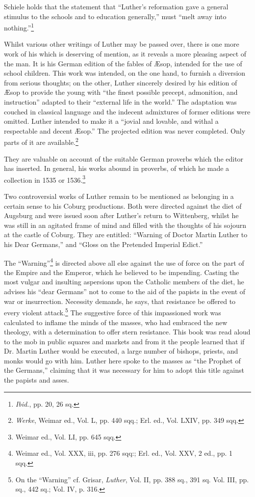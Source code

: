 Schiele holds that the statement that “Luther’s reformation gave a general
stimulus to the schools and to education generally,” must “melt away
into nothing.”\footnote{\textit{Ibid.}, pp. 20, 26 sq.}


Whilst various other writings of Luther may be passed over, there
is one more work of his which is deserving of mention, as it reveals
a more pleasing aspect of the man. It is his German edition of the
fables of Æsop, intended for the use of school children. This work
was intended, on the one hand, to furnish a diversion from serious
thoughts; on the other, Luther sincerely desired by his edition of
Æsop to provide the young with “the finest possible precept, admonition,
and instruction” adapted to their “external life in the world.”
The adaptation was couched in classical language and the indecent
admixtures of former editions were omitted. Luther intended to make
it a “jovial and lovable, and withal a respectable and decent Æsop.”
The projected edition was never completed. Only parts of it are
available.\footnote{\textit{Werke}, Weimar ed., Vol. L, pp. 440 sqq.; Erl. ed., Vol. LXIV, pp. 349 sqq.}

They are valuable on account of the suitable German
proverbs which the editor has inserted. In general, his works abound
in proverbs, of which he made a collection in 1535 or 1536.\footnote{Weimar ed., Vol. LI, pp. 645 sqq.}

Two controversial works of Luther remain to be mentioned as belonging
in a certain sense to his Coburg productions. Both were directed against
the diet of Augsburg and were issued soon after Luther’s return to Wittenberg,
whilst he was still in an agitated frame
of mind and filled with the thoughts of his sojourn at the castle of
Coburg. They are entitled: “Warning of Doctor Martin Luther to
his Dear Germans,” and “Gloss on the Pretended Imperial Edict.”

The “Warning”\footnote{Weimar ed., Vol. XXX, iii, pp. 276 sqq:; Erl. ed., Vol. XXV, 2 ed., pp. 1 sqq.}
is directed above all else against the use of force
on the part of the Empire and the Emperor, which he believed to be
impending. Casting the most vulgar and insulting aspersions upon
the Catholic members of the diet, he advises his “dear Germans” not
to come to the aid of the papists in the event of war or insurrection.
Necessity demands, he says, that resistance be offered to every violent
attack.\footnote{On the “Warning” cf. Grisar, \textit{Luther}, Vol. II, pp. 388 sq., 391 sq. Vol. III, pp. sq.,
442 sq.; Vol. IV, p. 316.}
The suggestive force of this impassioned work was calculated
to inflame the minds of the masses, who had embraced the new
theology, with a determination to offer stern resistance. This book
was read aloud to the mob in public squares and markets and from it
the people learned that if Dr. Martin Luther would be executed, a
large number of bishops, priests, and monks would go with him.
Luther here spoke to the masses as “the Prophet of the Germans,”
claiming that it was necessary for him to adopt this title against the
papists and asses.

